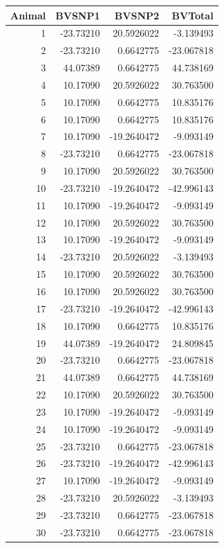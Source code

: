 \documentclass[
]{article}
\begin{document}
\begin{longtable}[]{@{}rrrr@{}}
\toprule()
Animal & BVSNP1 & BVSNP2 & BVTotal \\
\midrule()
\endhead
1 & -23.73210 & 20.5926022 & -3.139493 \\
2 & -23.73210 & 0.6642775 & -23.067818 \\
3 & 44.07389 & 0.6642775 & 44.738169 \\
4 & 10.17090 & 20.5926022 & 30.763500 \\
5 & 10.17090 & 0.6642775 & 10.835176 \\
6 & 10.17090 & 0.6642775 & 10.835176 \\
7 & 10.17090 & -19.2640472 & -9.093149 \\
8 & -23.73210 & 0.6642775 & -23.067818 \\
9 & 10.17090 & 20.5926022 & 30.763500 \\
10 & -23.73210 & -19.2640472 & -42.996143 \\
11 & 10.17090 & -19.2640472 & -9.093149 \\
12 & 10.17090 & 20.5926022 & 30.763500 \\
13 & 10.17090 & -19.2640472 & -9.093149 \\
14 & -23.73210 & 20.5926022 & -3.139493 \\
15 & 10.17090 & 20.5926022 & 30.763500 \\
16 & 10.17090 & 20.5926022 & 30.763500 \\
17 & -23.73210 & -19.2640472 & -42.996143 \\
18 & 10.17090 & 0.6642775 & 10.835176 \\
19 & 44.07389 & -19.2640472 & 24.809845 \\
20 & -23.73210 & 0.6642775 & -23.067818 \\
21 & 44.07389 & 0.6642775 & 44.738169 \\
22 & 10.17090 & 20.5926022 & 30.763500 \\
23 & 10.17090 & -19.2640472 & -9.093149 \\
24 & 10.17090 & -19.2640472 & -9.093149 \\
25 & -23.73210 & 0.6642775 & -23.067818 \\
26 & -23.73210 & -19.2640472 & -42.996143 \\
27 & 10.17090 & -19.2640472 & -9.093149 \\
28 & -23.73210 & 20.5926022 & -3.139493 \\
29 & -23.73210 & 0.6642775 & -23.067818 \\
30 & -23.73210 & 0.6642775 & -23.067818 \\
\bottomrule()
\end{longtable}
\end{document}

